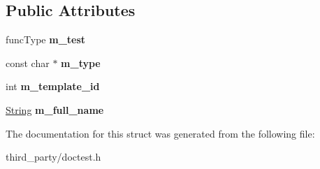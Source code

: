 \subsection*{Public Attributes}
\begin{DoxyCompactItemize}
\item 
\mbox{\label{structdoctest_1_1detail_1_1_test_case_aba46691733c89216ce6b0ac0b7dc6b42}} 
func\+Type {\bfseries m\+\_\+test}
\item 
\mbox{\label{structdoctest_1_1detail_1_1_test_case_ad29513e7194ebb6e53e3b1df27ebf48f}} 
const char $\ast$ {\bfseries m\+\_\+type}
\item 
\mbox{\label{structdoctest_1_1detail_1_1_test_case_af5183eb061a33329ede72791ad3457f9}} 
int {\bfseries m\+\_\+template\+\_\+id}
\item 
\mbox{\label{structdoctest_1_1detail_1_1_test_case_a30f21f77461de7bd68dc44362171b62a}} 
\mbox{\hyperlink{classdoctest_1_1_string}{String}} {\bfseries m\+\_\+full\+\_\+name}
\end{DoxyCompactItemize}


The documentation for this struct was generated from the following file\+:\begin{DoxyCompactItemize}
\item 
third\+\_\+party/doctest.\+h\end{DoxyCompactItemize}
